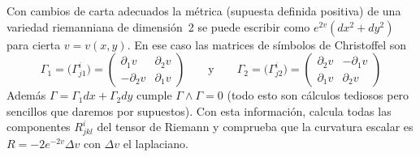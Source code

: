 \begin{problem}[10] Con cambios de carta adecuados la métrica (supuesta definida positiva) de una variedad riemanniana de dimensión~2 se puede escribir como $e^{2v}(dx^2+dy^2)$ para cierta $v=v(x,y)$. En ese caso las matrices de símbolos de Christoffel son 
	\[
	\Gamma_1=\big(\Gamma_{j1}^i\big)=
	\begin{pmatrix}
	\partial_1 v & \partial_2v
	\\
	-\partial_2 v & \partial_1v
	\end{pmatrix}
	\qquad\text{y}\qquad
	\Gamma_2=\big(\Gamma_{j2}^i\big)=
	\begin{pmatrix}
	\partial_2 v & -\partial_1v
	\\
	\partial_1 v & \partial_2v
	\end{pmatrix}
	\]
	Además $\Gamma= \Gamma_1dx+\Gamma_2dy$ cumple $\Gamma\wedge\Gamma=0$ (todo esto son cálculos tediosos pero sencillos que daremos por supuestos). Con esta información, calcula todas las componentes $R^i_{jkl}$ del tensor de Riemann y comprueba que la curvatura escalar es
	$R= -2 e^{-2v}\Delta v$ con $\Delta v$ el laplaciano.   
	

\end{problem}
